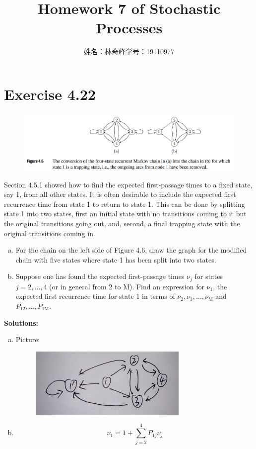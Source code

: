 \documentclass{article}
\begin{document}
    \title{Homework 7 of Stochastic Processes}
    \author{姓名：林奇峰\qquad 学号：19110977}
    \maketitle

    \section{Exercise 4.22}
    \begin{figure}[h]
        \centering
        \includegraphics[width=5.9in]{figure_4_6.png}
    \end{figure}
    Section 4.5.1 showed how to find the expected first-passage times to a fixed state, say 1, from all other states. It is often desirable to include the expected first recurrence time from state 1 to return to state 1. This can be done by splitting state 1 into two states, first an initial state with no transitions coming to it but the original transitions going out, and, second, a final trapping state with the original transitions coming in.
    \begin{enumerate}[(a)]
        \item For the chain on the left side of Figure 4.6, draw the graph for the modified chain with five states where state 1 has been split into two states.
        \item Suppose one has found the expected first-passage times $\nu_j$ for states $j=2,\dots,4$ (or in general from 2 to M). Find an expression for $\nu_1$, the expected first recurrence time for state 1 in terms of $\nu_2,\nu_3,\dots,\nu_\text{M}$ and $P_{12},\dots,P_{1\text{M}}$.
    \end{enumerate}

    \textbf{Solutions:}

    \begin{enumerate}[(a)]
        \item 
        Picture:
        \begin{figure}[h]
            \centering
            \includegraphics[width=3.0in]{1.jpg}
        \end{figure}
        \item   \begin{equation*}
                    \nu_1=1+\sum_{j=2}^4P_{1j}\nu_j
                \end{equation*}
    \end{enumerate}
\end{document}
